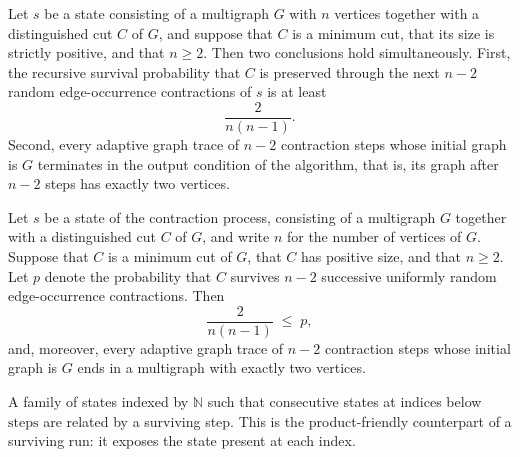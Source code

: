 \begin{theorem}
\label{KargerTrace.karger_algorithmic_trace_summary}
\leanok
{}
Let $s$ be a state consisting of a multigraph $G$ with $n$ vertices together with a
distinguished cut $C$ of $G$, and suppose that $C$ is a minimum cut, that its size is
strictly positive, and that $n \ge 2$. Then two conclusions hold simultaneously. First,
the recursive survival probability that $C$ is preserved through the next $n-2$ random
edge-occurrence contractions of $s$ is at least
\[
\frac{2}{n(n-1)}.
\]
Second, every adaptive graph trace of $n-2$ contraction steps whose initial graph is $G$
terminates in the output condition of the algorithm, that is, its graph after $n-2$
steps has exactly two vertices.
\end{theorem}

\begin{theorem}
\label{KargerTrace.adaptive_karger_trace_main}
\leanok
{}
Let $s$ be a state of the contraction process, consisting of a multigraph $G$ together
with a distinguished cut $C$ of $G$, and write $n$ for the number of vertices of $G$.
Suppose that $C$ is a minimum cut of $G$, that $C$ has positive size, and that $n \ge
2$. Let $p$ denote the probability that $C$ survives $n-2$ successive uniformly random
edge-occurrence contractions. Then
\[
\frac{2}{n(n-1)} \;\le\; p,
\]
and, moreover, every adaptive graph trace of $n-2$ contraction steps whose initial graph
is $G$ ends in a multigraph with exactly two vertices.
\end{theorem}

\begin{definition}
\label{KargerTrace.SurvivingTrace}
\leanok
{}
A family of states indexed by $\mathbb{N}$ such that consecutive states at indices below
$\text{steps}$ are related by a surviving step.  This is the product-friendly counterpart
of a surviving run: it exposes the state present at each index.
\end{definition}


